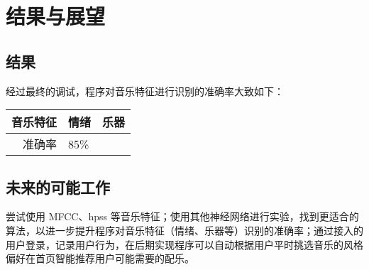 \documentclass[a4paper,utf8,10pt]{article}
\begin{document}
\section{结果与展望}
\subsection{结果}

经过最终的调试，程序对音乐特征进行识别的准确率大致如下：

\begin{center}
\begin{tabular}{ r | l | l }
\hline
音乐特征 & 情绪 & 乐器 \\ \hline
  准确率 & 85\% &      \\ \hline
\end{tabular}
\end{center}

\subsection{未来的可能工作}
尝试使用 MFCC、hpss 等音乐特征；使用其他神经网络进行实验，找到更适合的算法，以进一步提升程序对音乐特征（情绪、乐器等）识别的准确率；通过接入的用户登录，记录用户行为，在后期实现程序可以自动根据用户平时挑选音乐的风格偏好在首页智能推荐用户可能需要的配乐。

{}

\end{document}

